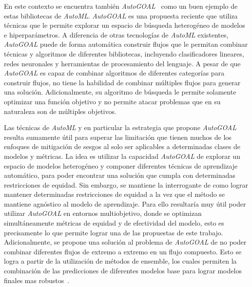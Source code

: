 
En este contexto se encuentra también \emph{AutoGOAL}~\parencite{autogoal} como un buen ejemplo de estas bibliotecas de \emph{AutoML}.
\emph{AutoGOAL} es una propuesta reciente que utiliza técnicas que le permite explorar un espacio de búsqueda heterogéneo de modelos e hiperparámetros.
A diferencia de otras tecnologías de \emph{AutoML} existentes, \emph{AutoGOAL} puede de forma automática construir flujos que le permitan combinar técnicas y algoritmos de diferentes bibliotecas, incluyendo clasificadores lineares, redes neuronales y herramientas de procesamiento del lenguaje.
A pesar de que \emph{AutoGOAL} es capaz de combinar algoritmos de diferentes categorías para construir flujos, no tiene la habilidad de combinar múltiples flujos para generar una solución.
Adicionalmente, su algoritmo de búsqueda le permite solamente optimizar una función objetivo y no permite atacar problemas que en su naturaleza son de múltiples objetivos.


Las técnicas de \emph{AutoML} y en particular la estrategia que propone \emph{AutoGOAL} resulta sumamente útil para superar las limitación que tienen muchos de los enfoques de mitigación de sesgos al solo ser aplicables a determinadas clases de modelos y métricas.
La idea es utilizar la capacidad \emph{AutoGOAL} de explorar un espacio de modelos heterogéneo y componer diferentes técnicas de aprendizaje automático, para poder encontrar una solución que cumpla con determinadas restricciones de equidad.
Sin embargo, se mantiene la interrogante de como lograr mantener determinadas restricciones de equidad a la vez que el método se mantiene agnóstico al modelo de aprendizaje.
Para ello resultaría muy útil poder utilizar \emph{AutoGOAL} en entornos multiobjetivo, donde se optimizan simultáneamente métricas de equidad y de efectividad del modelo, esto es precisamente lo que permite lograr una de las propuestas de este trabajo.
Adicionalmente, se propone una solución al problema de \emph{AutoGOAL} de no poder combinar diferentes flujos de extremo a extremo en un flujo compuesto.
Esto se logra a partir de la utilización de métodos de ensemble, los cuales permiten la combinación de las predicciones de diferentes modelos base para lograr modelos finales mas robustos~\parencite{polikar2006ensemble}.


